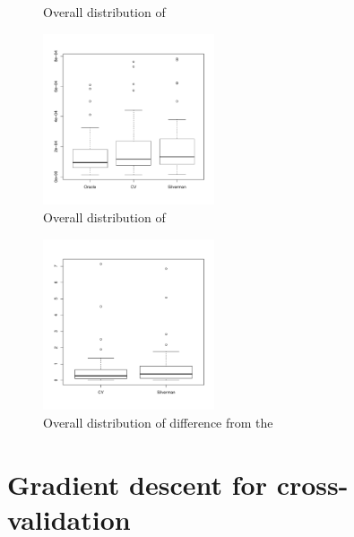 \begin{figure}[htbp]
\begin{subfigure}[t]{0.45\textwidth}
        \label{fig:discussion:overall_nmiae_boxplot:peak}
    \end{subfigure}
    \caption{Overall distribution of }
    \label{fig:discussion:overall_nmiae_boxplot}
\end{figure}

\begin{figure}[htbp]
  \centering
  \includegraphics[width=0.45\textwidth]{results/by_overall/normalized-sup-error-boxplot}
  \caption{Overall distribution of }
  \label{fig:discussion:overall_nsup_boxplot}
\end{figure}

\begin{figure}[htbp]
  \centering
  \includegraphics[width=0.45\textwidth]{results/by_overall/normalized-mise-diff-boxplot}
  \caption{Overall distribution of  difference from the }
  \label{fig:discussion:overall_nmise_diff_boxplot}
\end{figure}


\section{Gradient descent for cross-validation}
\label{sec:discussion:gradient_descent}

